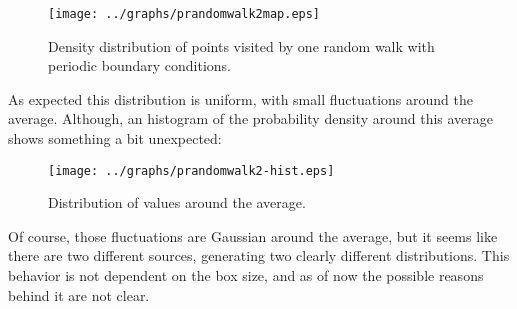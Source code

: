 \documentclass[10 pt]{article}
\begin{document}
\begin{figure}[H]
  \begin{center}
    \texttt{[image: ../graphs/prandomwalk2map.eps]}
    \caption{Density distribution of points visited by one random walk with periodic boundary conditions.}
  \end{center}
\end{figure}

As expected this distribution is uniform, with small fluctuations around the average. Although, an histogram of the probability density around this average shows something a bit unexpected:

\begin{figure}[H]
  \begin{center}
    \texttt{[image: ../graphs/prandomwalk2-hist.eps]}
    \caption{Distribution of values around the average.}
  \end{center}
\end{figure}

Of course, those fluctuations are Gaussian around the average, but it seems like there are two different sources, generating two clearly different distributions. This behavior is not dependent on the box size, and as of now the possible reasons behind it are not clear.
\end{document}
